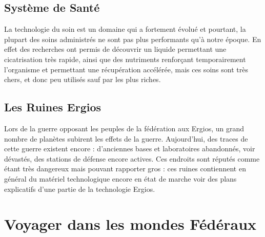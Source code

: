 \begin{multicols}{2}
\section{Système de Santé}

La technologie du soin est un domaine qui a fortement évolué et pourtant, la plupart des soins administrés ne sont pas plus performants qu’à notre époque. En effet des recherches ont permis de découvrir un liquide permettant une cicatrisation très rapide, ainsi que des nutriments renforçant temporairement l’organisme et permettant une récupération accélérée, mais ces soins sont très chers, et donc peu utilisés sauf par les plus riches.

\section{Les Ruines Ergios}

Lors de la guerre opposant les peuples de la fédération aux Ergios, un grand nombre de planètes subirent les effets de la guerre. Aujourd’hui, des traces de cette guerre existent encore : d’anciennes bases et laboratoires abandonnés, voir dévastés, des stations de défense encore actives. Ces endroits sont réputés comme étant très dangereux mais pouvant rapporter gros : ces ruines contiennent en général du matériel technologique encore en état de marche voir des plans explicatifs d’une partie de la technologie Ergios.

\end{multicols}

\chapter{Voyager dans les mondes Fédéraux}

